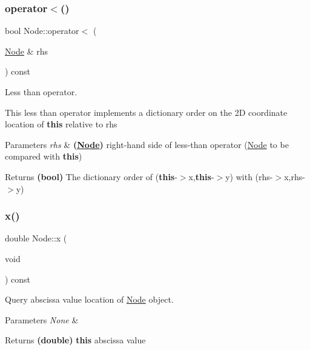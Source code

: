 \subsubsection{\texorpdfstring{operator$<$()}{operator<()}}
{\footnotesize\ttfamily bool Node\+::operator$<$ (\begin{DoxyParamCaption}\item[{\mbox{\hyperlink{class_node}{Node}} \&}]{rhs }\end{DoxyParamCaption}) const}



Less than operator. 

This less than operator implements a dictionary order on the 2D coordinate location of {\bfseries this} relative to rhs 
\begin{DoxyParams}{Parameters}
{\em rhs} & {\bfseries (\mbox{\hyperlink{class_node}{Node}})} right-\/hand side of less-\/than operator (\mbox{\hyperlink{class_node}{Node}} to be compared with {\bfseries this}) \\
\hline
\end{DoxyParams}
\begin{DoxyReturn}{Returns}
{\bfseries (bool)} The dictionary order of ({\bfseries this}-\/$>$x,{\bfseries this}-\/$>$y) with (rhs-\/$>$x,rhs-\/$>$y) 
\end{DoxyReturn}
\mbox{\label{class_node_a05d427a6fef833a49306b2adb52ef722}} 
\subsubsection{\texorpdfstring{x()}{x()}}
{\footnotesize\ttfamily double Node\+::x (\begin{DoxyParamCaption}\item[{void}]{ }\end{DoxyParamCaption}) const\hspace{0.3cm}{\ttfamily [inline]}}



Query abscissa value location of \mbox{\hyperlink{class_node}{Node}} object. 


\begin{DoxyParams}{Parameters}
{\em None} & \\
\hline
\end{DoxyParams}
\begin{DoxyReturn}{Returns}
{\bfseries (double)} {\bfseries this} abscissa value 
\end{DoxyReturn}
\mbox{\label{class_node_a5a06c0e486aa39a994b6a2fa674aa493}} 
